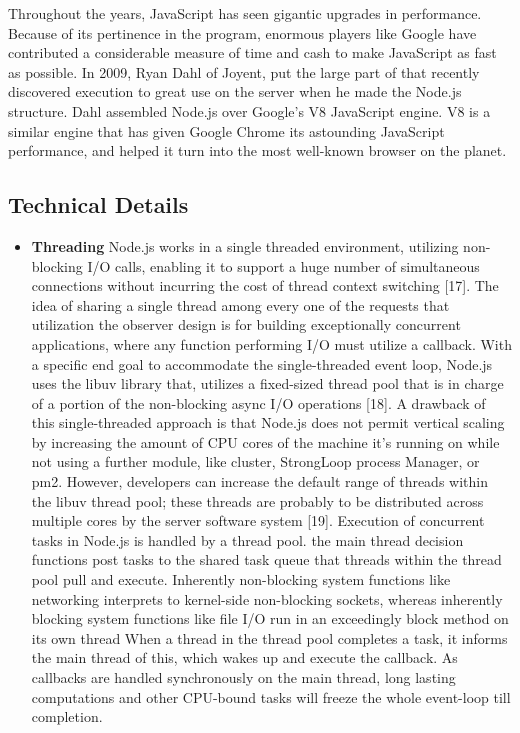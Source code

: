 \documentclass[../thesis.tex]{subfiles}
\begin{document}
Throughout the years, JavaScript has seen gigantic upgrades in performance. Because of its pertinence in the program, enormous players like Google have contributed a considerable measure of time and cash to make JavaScript as fast as possible. In 2009, Ryan Dahl of Joyent, put the large part of that recently discovered execution to great use on the server when he made the Node.js structure. Dahl assembled Node.js over Google's V8 JavaScript engine. V8 is a similar engine that has given Google Chrome its astounding JavaScript performance, and helped it turn into the most well-known browser on the planet.
\newpage
\subsection*{Technical Details}
\begin{itemize}
    \item \textbf{Threading}
    \vspace{5mm}
    Node.js works in a single threaded environment, utilizing non-blocking I/O calls, enabling it to support a huge number of simultaneous connections without incurring the cost of thread context switching [17]. The idea of sharing a single thread among every one of the requests that utilization the observer design is for building exceptionally concurrent applications, where any function performing I/O must utilize a callback. With a specific end goal to accommodate the single-threaded event loop, Node.js uses the libuv library that, utilizes a fixed-sized thread pool that is in charge of a portion of the non-blocking async I/O operations [18].
    \vspace{5mm}
    A drawback of this single-threaded approach is that Node.js does not permit vertical scaling by increasing the amount of CPU cores of the machine it's running on while not using a further module, like cluster, StrongLoop process Manager, or pm2. However, developers can increase the default range of threads within the libuv thread pool; these threads are probably to be distributed across multiple cores by the server software system [19].
    \vspace{5mm}
    Execution of concurrent tasks in Node.js is handled by a thread pool. the main thread decision functions post tasks to the shared task queue that threads within the thread pool pull and execute. Inherently non-blocking system functions like networking interprets to kernel-side non-blocking sockets, whereas inherently blocking system functions like file I/O run in an exceedingly block method on its own thread When a thread in the thread pool completes a task, it informs the main thread of this, which wakes up and execute the callback. As callbacks are handled synchronously on the main thread, long lasting computations and other CPU-bound tasks will freeze the whole event-loop till completion.

\end{itemize}
\end{document}
